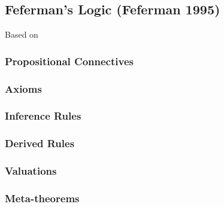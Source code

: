 \subsection{Feferman's Logic (Feferman 1995)}
Based on \cite{Feferman95}


\subsubsection{Propositional Connectives}


\subsubsection{Axioms}


\subsubsection{Inference Rules}


\subsubsection{Derived Rules}


\subsubsection{Valuations}


\subsubsection{Meta-theorems}

